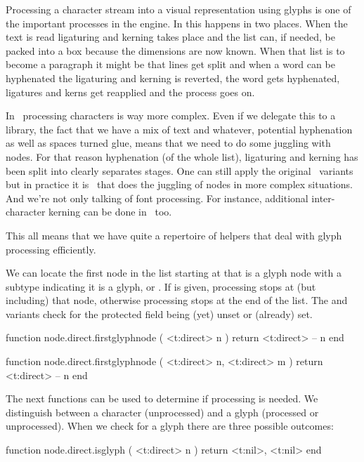 \stopsubsection

\startsubsection[title={Glyph handling}]

Processing a character stream into a visual representation using glyphs is one of
the important processes in the engine. In  this happens in two places. When
the text is read ligaturing and kerning takes place and the list can, if needed,
be packed into a box because the dimensions are now known. When that list is to
become a paragraph it might be that lines get split and when a word can be
hyphenated the ligaturing and kerning is reverted, the word gets hyphenated,
ligatures and kerns get reapplied and the process goes on.

In \OPENTYPE\ processing characters is way more complex. Even if we delegate this
to a library, the fact that we have a mix of text and whatever, potential
hyphenation as well as spaces turned glue, means that we need to do some juggling
with nodes. For that reason hyphenation (of the whole list), ligaturing and
kerning has been split into clearly separates stages. One can still apply the
original \TEX\ variants but in practice it is \LUA\ that does the juggling of
nodes in more complex situations. And we're not only talking of font processing.
For instance, additional inter-character kerning can be done in \LUA\ too.

This all means that we have quite a repertoire of helpers that deal with glyph
processing efficiently.

We can locate the first node in the list starting at  that is a glyph node
with a subtype indicating it is a glyph, or . If  is given,
processing stops at (but including) that node, otherwise processing stops at the
end of the list. The  and  variants check for the
protected field being (yet) unset or (already) set.

\starttyping[option=LUA]
function node.direct.firstglyphnode ( <t:direct> n )
    return <t:direct> -- n
end

function node.direct.firstglyphnode ( <t:direct> n, <t:direct> m )
    return <t:direct> -- n
end
\stoptyping

The next functions can be used to determine if processing is needed. We distinguish between
a character (unprocessed) and a glyph (processed or unprocessed). When we check for a glyph
there are three possible outcomes:

\starttyping[option=LUA]
function node.direct.isglyph ( <t:direct> n )
    return
        <t:nil>,
        <t:nil>
end

